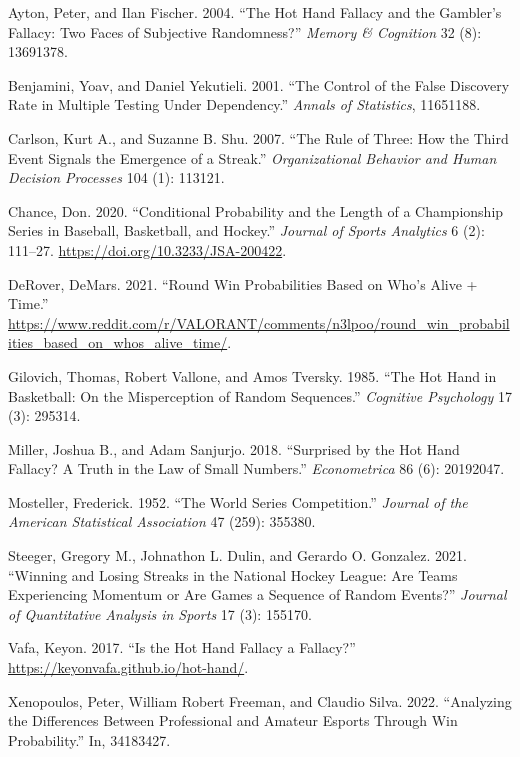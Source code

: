 \documentclass{article}
\newlength{\cslhangindent}
\newlength{\cslentryspacingunit} %
\newenvironment{CSLReferences}[2] %
 {%
  \setlength{\parindent}{0pt}
  \ifodd #1
  \let\oldpar\par
  \def\par{\hangindent=\cslhangindent\oldpar}
  \fi
  \setlength{\parskip}{#2\cslentryspacingunit}
 }%
 {}
\begin{document}
\hypertarget{refs}{}
\begin{CSLReferences}{1}{0}
\leavevmode{}%
Ayton, Peter, and Ilan Fischer. 2004. {``The Hot Hand Fallacy and the
Gambler{'}s Fallacy: Two Faces of Subjective Randomness?''} \emph{Memory
\& Cognition} 32 (8): 13691378.

\leavevmode{}%
Benjamini, Yoav, and Daniel Yekutieli. 2001. {``The Control of the False
Discovery Rate in Multiple Testing Under Dependency.''} \emph{Annals of
Statistics}, 11651188.

\leavevmode{}%
Carlson, Kurt A., and Suzanne B. Shu. 2007. {``The Rule of Three: How
the Third Event Signals the Emergence of a Streak.''}
\emph{Organizational Behavior and Human Decision Processes} 104 (1):
113121.

\leavevmode{}%
Chance, Don. 2020. {``Conditional Probability and the Length of a
Championship Series in Baseball, Basketball, and Hockey.''}
\emph{Journal of Sports Analytics} 6 (2): 111--27.
\url{https://doi.org/10.3233/JSA-200422}.

\leavevmode{}%
DeRover, DeMars. 2021. {``Round Win Probabilities Based on Who's Alive +
Time.''}
\url{https://www.reddit.com/r/VALORANT/comments/n3lpoo/round_win_probabilities_based_on_whos_alive_time/}.

\leavevmode{}%
Gilovich, Thomas, Robert Vallone, and Amos Tversky. 1985. {``The Hot
Hand in Basketball: On the Misperception of Random Sequences.''}
\emph{Cognitive Psychology} 17 (3): 295314.

\leavevmode{}%
Miller, Joshua B., and Adam Sanjurjo. 2018. {``Surprised by the Hot Hand
Fallacy? A Truth in the Law of Small Numbers.''} \emph{Econometrica} 86
(6): 20192047.

\leavevmode{}%
Mosteller, Frederick. 1952. {``The World Series Competition.''}
\emph{Journal of the American Statistical Association} 47 (259): 355380.

\leavevmode{}%
Steeger, Gregory M., Johnathon L. Dulin, and Gerardo O. Gonzalez. 2021.
{``Winning and Losing Streaks in the National Hockey League: Are Teams
Experiencing Momentum or Are Games a Sequence of Random Events?''}
\emph{Journal of Quantitative Analysis in Sports} 17 (3): 155170.

\leavevmode{}%
Vafa, Keyon. 2017. {``Is the Hot Hand Fallacy a Fallacy?''}
\url{https://keyonvafa.github.io/hot-hand/}.

\leavevmode{}%
Xenopoulos, Peter, William Robert Freeman, and Claudio Silva. 2022.
{``Analyzing the Differences Between Professional and Amateur Esports
Through Win Probability.''} In, 34183427.

\end{CSLReferences}



\end{document}
